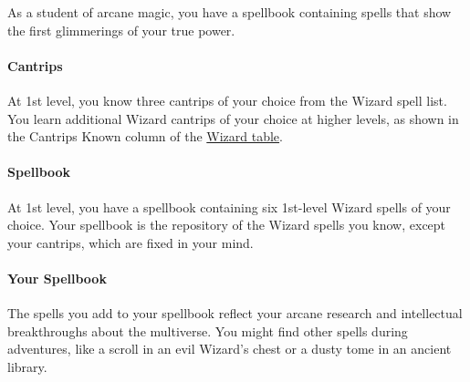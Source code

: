 As a student of arcane magic, you have a spellbook containing spells
that show the first glimmerings of your true power.

\paragraph{Cantrips}\label{_cantrips}

At 1st level, you know three cantrips of your choice from the Wizard
spell list. You learn additional Wizard cantrips of your choice at
higher levels, as shown in the Cantrips Known column of the
\hyperref[wizard-table]{Wizard table}.

\paragraph{Spellbook}\label{_spellbook}

At 1st level, you have a spellbook containing six 1st-level Wizard
spells of your choice. Your spellbook is the repository of the Wizard
spells you know, except your cantrips, which are fixed in your mind.

\paragraph{Your Spellbook}\label{_your_spellbook}

The spells you add to your spellbook reflect your arcane research and
intellectual breakthroughs about the multiverse. You might find other
spells during adventures, like a scroll in an evil Wizard's chest or a
dusty tome in an ancient library.

